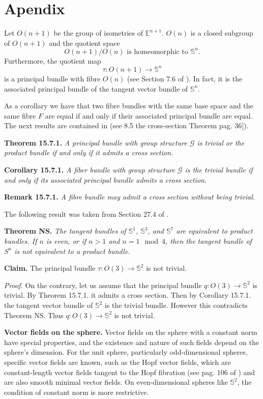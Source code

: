 \documentclass[12pt]{amsart}
\begin{document}
\section{Apendix} 
Let $O(n+1)$ be the group of isometries of $\mathbb{E}^{n+1}$. $O(n)$ is a closed subgroup of $O(n+1)$ and the quotient space
$$
O(n+1)/O(n) \textrm{ is homeomorphic to } \mathbb{S}^n.
$$
Furthermore, the quotient map
$$
\tau:O(n+1) \rightarrow \mathbb{S}^n
$$
is a principal bundle with fibre $O(n)$ (see Section 7.6 of \cite{steenrod}). In fact, it is the associated principal bundle of the tangent vector bundle of $\mathbb{S}^n$.

As a corollary we have that two fibre bundles with the same base space and the same fibre $F$ are equal if and only if their associated principal bundle are equal. The next results are contained in \cite{steenrod} (see 8.5 the cross-section Theorem pag. 36]).

\textbf{Theorem 15.7.1.} \textit{A principal bundle with group structure
$\mathcal{G}$ is trivial or the product bundle if and only if it admits a cross section.}

\textbf{Corollary 15.7.1.} \textit{A fiber bundle with group structure $\mathcal{G}$ is the trivial bundle if and only if its associated principal bundle admits a cross section}.

\textbf{Remark 15.7.1.} \textit{A fibre bundle may admit a cross section without being trivial}.
 
The following result was taken from Section 27.4 of \cite{steenrod}.
 
\textbf{Theorem NS.} \textit{The tangent bundles of $\mathbb{S}^1$, $\mathbb{S}^3$, and $\mathbb{S}^7$ are equivalent to product bundles. If $n$ is even, or if $n> 1$ and 
$n= 1\mod 4$, then the tangent bundle of $S^n$ is not equivalent to a product bundle.} 
 
\textbf{Claim.} The principal bundle $\tau:O(3) \rightarrow \mathbb{S}^2$ is not trivial.  

\textit{Proof.} On the contrary, let us assume that the principal bundle $q:O(3) \rightarrow \mathbb{S}^2$ is trivial.  By Theorem 15.7.1. it admits a cross section. Then by Corollary 15.7.1. the tangent vector bundle of $\mathbb{S}^2$ is the trivial bundle. However this contradicts Theorem NS. Thus  $q:O(3) \rightarrow \mathbb{S}^2$ is not trivial.

\textbf{Vector fields on the sphere.}
Vector fields on the sphere with a constant norm have special properties, and the existence and nature of such fields depend on the sphere's dimension. For the unit sphere, particularly odd-dimensional spheres, specific vector fields are known, such as the Hopf vector fields, which are constant-length vector fields tangent to the Hopf fibration (see pag. 106 of \cite{steenrod}) and are also smooth minimal vector fields. On even-dimensional spheres like $\mathbb{S}^2$, the condition of constant norm is more restrictive. 
\end{document}
